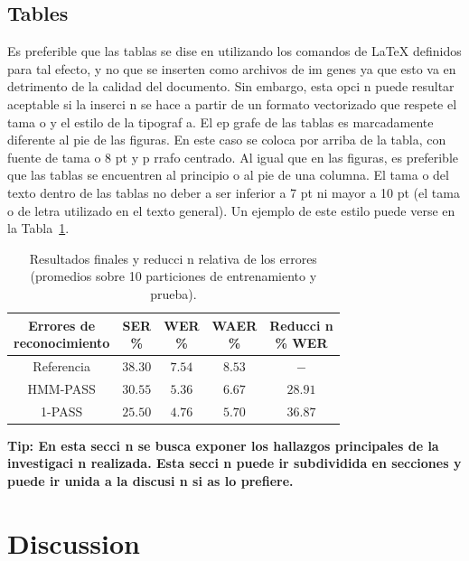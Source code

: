\documentclass{article}
\begin{document}
\subsection{Tables}
Es preferible que las tablas se dise en utilizando los comandos de \LaTeX\xspace definidos para tal efecto,
y no que se inserten como archivos de im genes ya que esto va en detrimento de la calidad del
documento. Sin embargo, esta opci n puede resultar aceptable si la inserci n se hace a partir de un
formato vectorizado que respete el tama o y el estilo de la tipograf a.
El ep grafe de las tablas es marcadamente diferente al pie de las figuras. En este caso se coloca por
arriba de la tabla, con fuente de tama o 8 pt y p rrafo centrado.
Al igual que en las figuras, es preferible que las tablas se encuentren al principio o al pie de una
columna. El tama o del texto dentro de las tablas no deber a ser inferior a 7 pt ni mayor a 10 pt (el
tama o de letra utilizado en el texto general).
Un ejemplo de este estilo puede verse en la Tabla~\ref{tabla-1}.

\begin{table}[!b]
 \centering
  \caption{Resultados finales y reducci n relativa de los errores (promedios sobre 10 particiones de
 entrenamiento y prueba).} \label{tabla-1}
 {\small
 \begin{tabular}{ccccc}
  \hline
  \hline
  \thead{Errores de \\ reconocimiento} & \thead{SER \\ \%} & \thead{WER \\ \%} & \thead{WAER \\ \%} &
                        \thead{Reducci n \\ \% WER} \\
  \hline
  \hline
  Referencia & $38.30$ & $7.54$ & $8.53$ & $-$ \\
  \hline
  HMM-PASS & $30.55$ & $5.36$ & $6.67$ & $28.91$ \\
  1-PASS & $25.50$ & $4.76$ & $5.70$ & $36.87$   \\
  \hline
  \hline
 \end{tabular}}
\end{table}

\textbf{Tip: En esta secci n se busca exponer los hallazgos principales de la investigaci n realizada. Esta secci n puede ir subdividida en secciones y puede ir unida a la discusi n si as  lo prefiere.} 

\section{Discussion}
\end{document}
